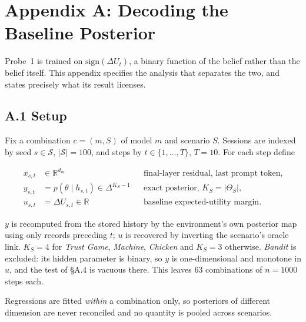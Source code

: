 
\section{Appendix A: Decoding the Baseline Posterior}
\label{app:posterior}

Probe~1 is trained on $\mathrm{sign}(\Delta U_t)$, a binary function of the
belief rather than the belief itself. This appendix specifies the analysis that
separates the two, and states precisely what its result licenses.

\subsection{A.1 Setup}

Fix a combination $c=(m,S)$ of model $m$ and scenario $S$. Sessions are indexed
by seed $s\in\mathcal{S}$, $|\mathcal{S}|=100$, and steps by $t\in\{1,\dots,T\}$,
$T=10$. For each step define

\begin{align*}
x_{s,t} &\in \mathbb{R}^{d_m}
  && \text{final-layer residual, last prompt token,}\\
y_{s,t} &= p(\theta\mid h_{s,t}) \in \Delta^{K_S-1}
  && \text{exact posterior, } K_S=|\Theta_S|,\\
u_{s,t} &= \Delta U_{s,t} \in \mathbb{R}
  && \text{baseline expected-utility margin.}
\end{align*}

$y$ is recomputed from the stored history by the environment's own posterior
map using only records preceding $t$; $u$ is recovered by inverting the
scenario's oracle link. $K_S=4$ for \textit{Trust Game}, \textit{Machine},
\textit{Chicken} and $K_S=3$ otherwise. \textit{Bandit} is excluded: its
hidden parameter is binary, so $y$ is one-dimensional and monotone in $u$, and
the test of \S A.4 is vacuous there. This leaves $63$ combinations of
$n=1000$ steps each.

Regressions are fitted \emph{within} a combination only, so posteriors of
different dimension are never reconciled and no quantity is pooled across
scenarios.

